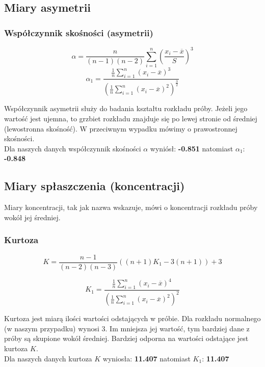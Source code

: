 \documentclass{article}
\theoremstyle{break}
\begin{document}
	\subsection{Miary asymetrii}
	\subsubsection*{Współczynnik skośności (asymetrii)}
	
	$$\alpha =\frac{n}{(n-1)(n-2)}\sum\limits_{i=1}^{n}(\frac{x_i-\overline{x}}{S})^3$$
	$$\alpha_1 =\frac{\frac{1}{n}\sum\limits_{i=1}^{n}(x_i-\overline{x})^3}{(\frac{1}{n}\sum\limits_{i=1}^{n}(x_i-\overline{x})^2)^{\frac{3}{2}}}$$
	
	Współczynnik asymetrii służy do badania kształtu rozkładu próby. Jeżeli jego wartość jest ujemna, to grzbiet rozkładu znajduje się po lewej stronie od średniej (lewostronna skośność). W przeciwnym wypadku mówimy o prawostronnej skośności. 
	\\Dla naszych danych współczynnik skośności $\alpha$ wyniósł: \textbf{-0.851} natomiast $\alpha_1$: \textbf{-0.848}
	
	\subsection{Miary spłaszczenia (koncentracji)}
	
	Miary koncentracji, tak jak nazwa wskazuje, mówi o koncentracji rozkładu próby wokół jej średniej.
	
	\subsubsection*{Kurtoza}
	
	$$K=\frac{n-1}{(n-2)(n-3)}((n+1)K_1-3(n+1))+3$$

	$$K_1 =\frac{\frac{1}{n}\sum\limits_{i=1}^{n}(x_i-\overline{x})^4}{(\frac{1}{n}\sum\limits_{i=1}^{n}(x_i-\overline{x})^2)^2}$$
	
	Kurtoza jest miarą ilości wartości odstających w próbie. Dla rozkładu normalnego (w naszym przypadku) wynosi 3. Im mniejsza jej wartość, tym bardziej dane z próby są skupione wokół średniej. Bardziej odporna na wartości odstające jest kurtoza $K$.
	\\Dla naszych danych kurtoza $K$ wyniosła: \textbf{11.407} natomiast $K_1$: \textbf{11.407}
	
\end{document}
